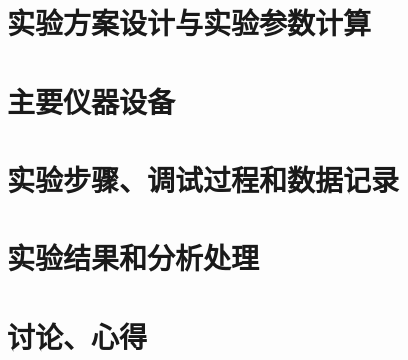 \documentclass{zjureport}
\begin{document}
\section{实验方案设计与实验参数计算}


\section{主要仪器设备}


\section{实验步骤、调试过程和数据记录}


\section{实验结果和分析处理}


\section{讨论、心得}
\end{document}
